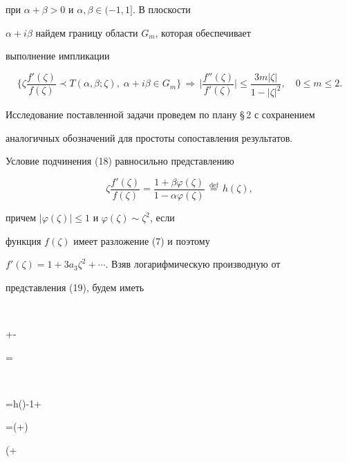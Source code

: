 при $\alpha+\beta>0$ и $\alpha,\beta\in(-1,1]$. В плоскости


$\alpha+i\beta$ найдем границу области $G_m$, которая обеспечивает


выполнение импликации


\begin{equation}


\biggl\{\zeta\frac{f'(\zeta)}{f(\zeta)}\prec T(\alpha,\beta;\zeta),


\;\alpha+i\beta\in G_m\biggr\}\,\Longrightarrow\,


\biggl|\frac{f''(\zeta)}{f'(\zeta)} \biggr|\le


\frac{3m|\zeta|}{1-|\zeta|^2},\quad 0\le m\le 2.


\end{equation}


Исследование поставленной задачи проведем по плану \S\,2 с сохранением


аналогичных обозначений для простоты сопоставления результатов.





Условие подчинения (18) равносильно представлению


\begin{equation}


\zeta\frac{f'(\zeta)}{f(\zeta)}=


\frac{1+\beta\varphi(\zeta)}{1-\alpha\varphi(\zeta)}


\,\overset{\text{def}}{=}{}\,h(\zeta),


\end{equation}


причем $|\varphi(\zeta)|\le 1$ и $\varphi(\zeta)\sim\zeta^2$, если


функция $f(\zeta)$ имеет разложение (7) и поэтому


$f'(\zeta)=1+3a_3\zeta^2+\dotsb$. Взяв логарифмическую производную от


представления (19), будем иметь


$$


+-


=


\,\Longrightarrow\,


\zeta{}=h(\zeta)-1+\zeta


=(\alpha+\beta)


\biggl(+



